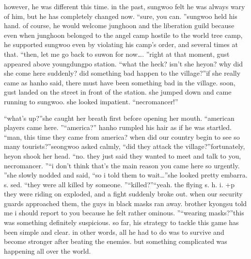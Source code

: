  however, he was different this time.
 in the past, sungwoo felt he was always wary of him, but he has completely changed now.
“sure, you can.
”sungwoo held his hand.
 of course, he would welcome junghoon and the liberation guild because even when junghoon belonged to the angel camp hostile to the world tree camp, he supported sungwoo even by violating his camp's order, and several times at that.
“then, let me go back to suwon for now….
”right at that moment, gust appeared above youngdungpo station.
“what the heck? isn't she heyon? why did she come here suddenly? did something bad happen to the village?”if she really came as hanho said, there must have been something bad in the village.
soon, gust landed on the street in front of the station.
 she jumped down and came running to sungwoo.
 she looked impatient.
“necromancer!”

“what's up?”she caught her breath first before opening her mouth.
“american players came here.
”“america?” hanho rumpled his hair as if he was startled.
“man, this time they came from america? when did our country begin to see so many tourists?”seongwoo asked calmly, “did they attack the village?”fortunately, heyon shook her head.
“no.
 they just said they wanted to meet and talk to you, necromancer.
”“i don't think that's the main reason you came here so urgently.
”she slowly nodded and said, “so i told them to wait…”she looked pretty embarra.
s.
sed.
“they were all killed by someone.
”“killed?”“yeah.
 the flying s.
h.
i.
+p they were riding on exploded, and a fight suddenly broke out.
 when our security guards approached them, the guys in black masks ran away.
 brother kyongsu told me i should report to you because he felt rather ominous.
”“wearing masks?”this was something definitely suspicious.
so far, his strategy to tackle this game has been simple and clear.
 in other words, all he had to do was to survive and become stronger after beating the enemies.
but something complicated was happening all over the world.


 